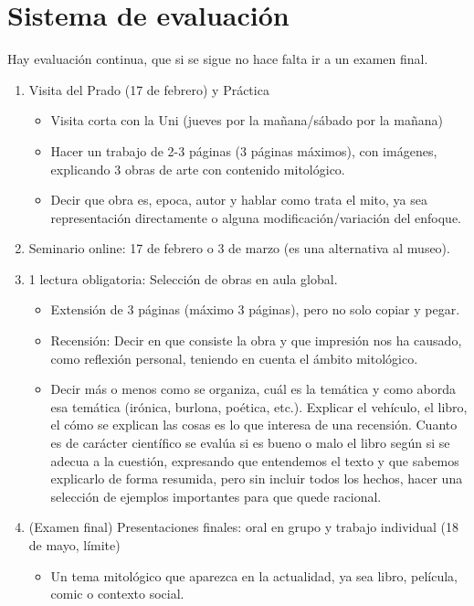 \section{Sistema de evaluación}\label{sec:sistema-de-evaluación}
Hay evaluación continua, que si se sigue no hace falta ir a un examen final.
\begin{enumerate}
    \item Visita del Prado (17 de febrero) y Práctica
    \begin{itemize}
      \item Visita corta con la Uni (jueves por la mañana/sábado por la mañana)
      \item Hacer un trabajo de 2-3 páginas (3 páginas máximos), con imágenes, explicando 3 obras de arte con contenido mitológico.
      \item Decir que obra es, epoca, autor y hablar como trata el mito, ya sea representación directamente o alguna modificación/variación del enfoque.
    \end{itemize}
  \item Seminario online: 17 de febrero o 3 de marzo (es una alternativa al museo).
  \item 1 lectura obligatoria: Selección de obras en aula global.
    \begin{itemize}
      \item Extensión de 3 páginas (máximo 3 páginas), pero no solo copiar y pegar.
      \item Recensión: Decir en que consiste la obra y que impresión nos ha causado, como reflexión personal, teniendo en cuenta el ámbito mitológico.
      \item Decir más o menos como se organiza, cuál es la temática y como aborda esa temática (irónica, burlona, poética, etc.). Explicar el vehículo, el libro, el cómo se explican las cosas es lo que interesa de una recensión. Cuanto es de carácter científico se evalúa si es bueno o malo el libro según si se adecua a la cuestión, expresando que entendemos el texto y que sabemos explicarlo de forma resumida, pero sin incluir todos los hechos, hacer una selección de ejemplos importantes para que quede racional.
    \end{itemize}
  \item (Examen final) Presentaciones finales: oral en grupo y trabajo individual (18 de mayo, límite)
    \begin{itemize}
      \item Un tema mitológico que aparezca en la actualidad, ya sea libro, película, comic o contexto social.

\end{itemize}
\end{enumerate}
